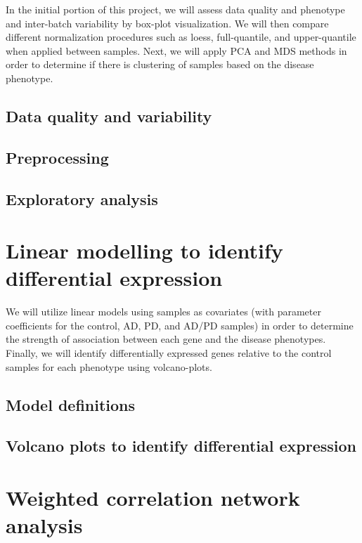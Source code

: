  In the initial portion of this project, we will assess data quality and phenotype and  inter-batch variability by box-plot visualization. We will then compare different normalization procedures such as loess, full-quantile, and upper-quantile when applied between samples. Next, we will apply PCA and MDS methods in order to determine if there is clustering of samples based on the disease phenotype.


\subsection{Data quality and variability}
\label{subsec:data-qual-vari}

\subsection{Preprocessing}
\label{subsec:preprocessing}

\subsection{Exploratory analysis}
\label{subsec:exploratory-analysis}



\section{Linear modelling to identify differential expression}
\label{sec:line-modell-ident}

We will utilize linear models using samples as covariates (with parameter coefficients for the control, AD, PD, and AD/PD samples) in order to determine the strength of association between each gene and the disease phenotypes. Finally, we will identify differentially expressed genes relative to the control samples for each phenotype using  volcano-plots.


\subsection{Model definitions}
\label{subsec:model-definitions}

\subsection{Volcano plots to identify differential expression}
\label{subsec:volc-plots-ident}


\section{Weighted correlation network analysis}
\label{sec:weight-corr-netw}

